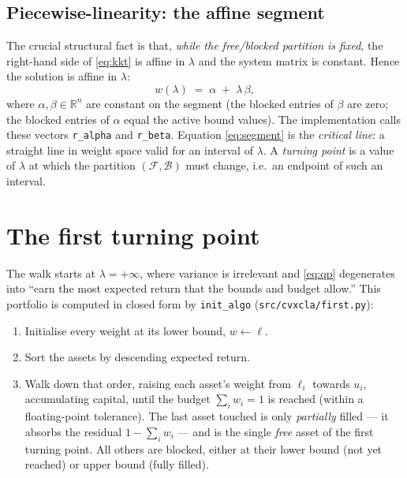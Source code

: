 \documentclass[11pt]{article}
\newcommand{\R}{\mathbb{R}}
\newcommand{\F}{\mathcal{F}}        %
\newcommand{\B}{\mathcal{B}}        %
\newcommand{\lb}{\ell}              %
\newcommand{\ub}{u}                 %
\begin{document}
\subsection{Piecewise-linearity: the affine segment}

The crucial structural fact is that, \emph{while the free/blocked partition is fixed},
the right-hand side of \eqref{eq:kkt} is affine in $\lambda$ and the system matrix is
constant. Hence the solution is affine in $\lambda$:
\begin{equation}
\label{eq:segment}
w(\lambda) \;=\; \alpha \;+\; \lambda\,\beta,
\end{equation}
where $\alpha,\beta\in\R^n$ are constant on the segment (the blocked entries of $\beta$
are zero; the blocked entries of $\alpha$ equal the active bound values). The
implementation calls these vectors \texttt{r\_alpha} and \texttt{r\_beta}. Equation
\eqref{eq:segment} is the \emph{critical line}: a straight line in weight space valid
for an interval of $\lambda$. A \emph{turning point} is a value of $\lambda$ at which
the partition $(\F,\B)$ must change, i.e.\ an endpoint of such an interval.

\section{The first turning point}
\label{sec:first}

The walk starts at $\lambda = +\infty$, where variance is irrelevant and \eqref{eq:qp}
degenerates into ``earn the most expected return that the bounds and budget allow.''
This portfolio is computed in closed form by \texttt{init\_algo}
(\texttt{src/cvxcla/first.py}):

\begin{enumerate}
\item Initialise every weight at its lower bound, $w \gets \lb$.
\item Sort the assets by descending expected return.
\item Walk down that order, raising each asset's weight from $\lb_i$ towards $\ub_i$,
      accumulating capital, until the budget $\sum_i w_i = 1$ is reached (within a
      floating-point tolerance). The last asset touched is only \emph{partially}
      filled --- it absorbs the residual $1 - \sum_i w_i$ --- and is the single
      \emph{free} asset of the first turning point. All others are blocked, either at
      their lower bound (not yet reached) or upper bound (fully filled).
\end{enumerate}
\end{document}

